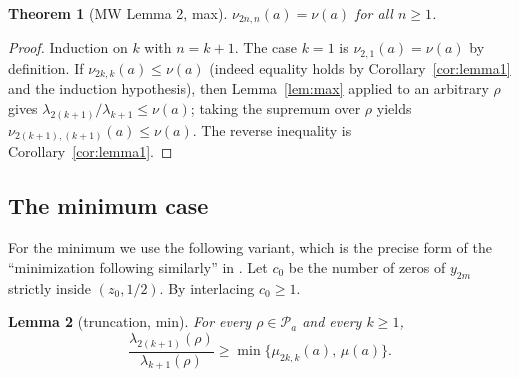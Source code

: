 ﻿\documentclass[11pt]{article}
\newtheorem{theorem}{Theorem}[section]
\newtheorem{lemma}[theorem]{Lemma}
\begin{document}
\begin{theorem}[MW Lemma 2, max]\label{thm:max}
	$\nu_{2n,n}(a)=\nu(a)$ for all $n\ge 1$.
\end{theorem}

\begin{proof}
	Induction on $k$ with $n=k+1$.  The case $k=1$ is
	$\nu_{2,1}(a)=\nu(a)$ by definition.  If
	$\nu_{2k,k}(a)\le\nu(a)$ (indeed equality holds by
	Corollary~\ref{cor:lemma1} and the induction hypothesis), then
	Lemma~\ref{lem:max} applied to an arbitrary $\rho$ gives
	$\lambda_{2(k+1)}/\lambda_{k+1}\le\nu(a)$; taking the supremum over
	$\rho$ yields $\nu_{2(k+1),(k+1)}(a)\le\nu(a)$.  The reverse inequality
	is Corollary~\ref{cor:lemma1}.
\end{proof}

\subsection{The minimum case}

For the minimum we use the following variant, which is the precise form of
the ``minimization following similarly'' in \cite{mw}.  Let
$c_0$ be the number of zeros of $y_{2m}$ strictly inside $(z_0,1/2)$.
By interlacing $c_0\ge 1$.

\begin{lemma}[truncation, min]\label{lem:min}
	For every $\rho\in\mathcal P_a$ and every $k\ge 1$,
	\begin{equation*}
		\frac{\lambda_{2(k+1)}(\rho)}{\lambda_{k+1}(\rho)}
		\ge\min\bigl\{\mu_{2k,k}(a),\,\mu(a)\bigr\}.
	\end{equation*}
\end{lemma}
\end{document}

